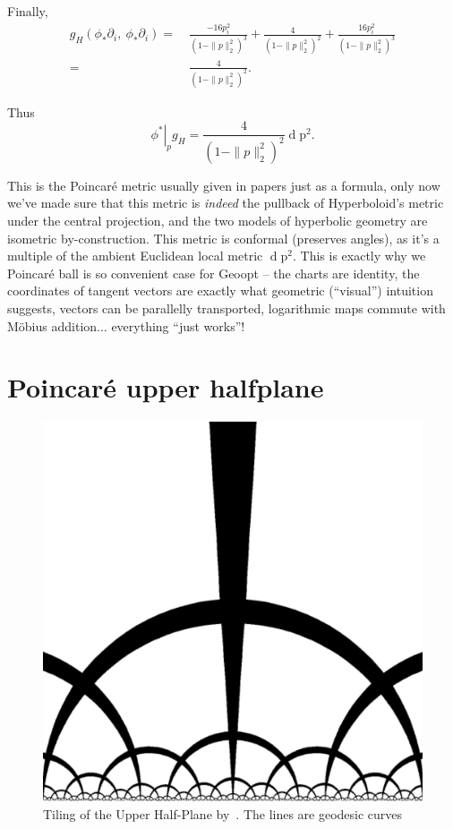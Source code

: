 Finally,
\begin{align*}
g_H(\phi_*\partial_i,~\phi_*\partial_i)
= &~\frac{-16 p_i^2}{(1 - \|p\|_2^2)^3} 
  + \frac{4}{(1-\|p\|_2^2)^2} 
  + \frac{16p_i^2}{(1 - \|p\|_2^2)^3} \\
= &~\frac{4}{(1 - \|p\|_2^2)^2}.
\end{align*}

Thus
\[ \left.\phi^*\right|_p g_H = \frac{4}{(1 - \|p\|_2^2)^2} \operatorname{d}\mathrm{p}^2. \]

This is the Poincar\'e metric usually given in papers just as a formula, only now
we've made sure that this metric is \emph{indeed} the pullback of Hyperboloid's
metric under the central projection, and the two models of hyperbolic geometry
are isometric by-construction. This metric is conformal (preserves angles), as
it's a multiple of the ambient Euclidean local metric \( \operatorname{d}\mathrm{p}^2
\). This is exactly why we Poincar\'e ball is so convenient case for Geoopt
-- the charts are identity, the coordinates of tangent vectors are exactly what
geometric (``visual'') intuition suggests, vectors can be parallelly transported,
logarithmic maps commute with M\"obius addition... everything ``just works''!

\section{Poincar\'e upper halfplane}

\begin{figure}
    \center
    \includegraphics[width=.8 \linewidth]{art/tiling-uhp.pdf}
    \caption{Tiling of the Upper Half-Plane by~\citet{bulatovConformal}. The lines
    are geodesic curves}
\end{figure}

